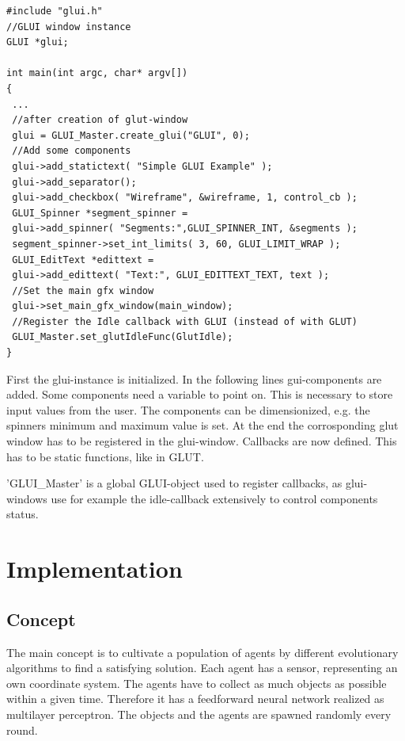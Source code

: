 \documentclass[10pt,a4paper,DIV=11]{scrreprt}
\begin{document}
\begin{lstlisting}[caption={Creating a GLUI-window},label=lst:glui-create]
#include "glui.h"
//GLUI window instance
GLUI *glui;

int main(int argc, char* argv[])
{
 ...
 //after creation of glut-window
 glui = GLUI_Master.create_glui("GLUI", 0);
 //Add some components
 glui->add_statictext( "Simple GLUI Example" );
 glui->add_separator();
 glui->add_checkbox( "Wireframe", &wireframe, 1, control_cb );
 GLUI_Spinner *segment_spinner =
 glui->add_spinner( "Segments:",GLUI_SPINNER_INT, &segments );
 segment_spinner->set_int_limits( 3, 60, GLUI_LIMIT_WRAP );
 GLUI_EditText *edittext =
 glui->add_edittext( "Text:", GLUI_EDITTEXT_TEXT, text );
 //Set the main gfx window
 glui->set_main_gfx_window(main_window);
 //Register the Idle callback with GLUI (instead of with GLUT)
 GLUI_Master.set_glutIdleFunc(GlutIdle);
}
\end{lstlisting}

First the glui-instance is initialized. In the following lines gui-components are added. Some components need a variable to point on. This is necessary to store input values from the user. The components can be dimensionized, e.g. the spinners minimum and maximum value is set.
At the end the corrosponding glut window has to be registered in the glui-window.
Callbacks are now defined. This has to be static functions, like in GLUT.

'GLUI\_Master' is a global GLUI-object used to register callbacks, as glui-windows use for example the idle-callback extensively to control components status.

\chapter{Implementation}

\section{Concept}
The main concept is to cultivate a population of agents by different evolutionary algorithms to find a satisfying solution. Each agent has a sensor, representing an own coordinate system. The agents have to collect as much objects as possible within a given time. Therefore it has a feedforward neural network realized as multilayer perceptron.
The objects and the agents are spawned randomly every round.
\end{document}
